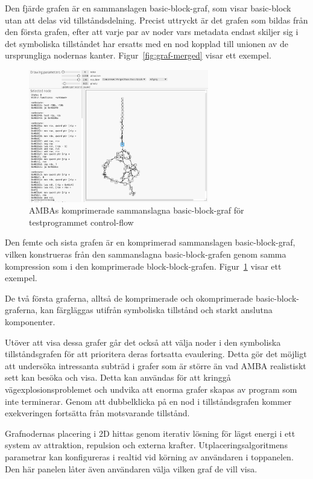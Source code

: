 Den fjärde grafen är en sammanslagen basic-block-graf, som visar basic-block
utan att delas vid tillståndsdelning. Precist uttryckt är det grafen som bildas
från den första grafen, efter att varje par av noder vars metadata endast
skiljer sig i det symboliska tillståndet har ersatts med en nod kopplad till unionen av
de ursprungliga nodernas kanter. Figur~\ref{fig:graf-merged} visar ett exempel.

\begin{figure}
    \centering
    \includegraphics[width=0.7\textwidth]{figures/graph_merged_compressed.png}
    \caption{
        AMBAs komprimerade sammanslagna basic-block-graf för testprogrammet control-flow
    }\label{fig:graf-merged-compressed}
\end{figure}

Den femte och sista grafen är en komprimerad sammanslagen basic-block-graf,
vilken konstrueras från den sammanslagna basic-block-grafen genom samma
kompression som i den komprimerade block-block-grafen.
Figur~\ref{fig:graf-merged-compressed} visar ett exempel.

De två första graferna, alltså de komprimerade och okomprimerade
basic-block-graferna, kan färgläggas utifrån symboliska tillstånd och starkt
anslutna komponenter.

Utöver att visa dessa grafer går det också att välja noder i den symboliska
tillståndsgrafen för att prioritera deras fortsatta evaulering. Detta gör det
möjligt att undersöka intressanta subträd i grafer som är större än vad AMBA
realistiskt sett kan besöka och visa. Detta kan användas för att kringgå
vägexplosionsproblemet och undvika att enorma grafer skapas av program som inte
terminerar. Genom att dubbelklicka på en nod i tillståndsgrafen kommer
exekveringen fortsätta från motsvarande tillstånd.

Grafnodernas placering i 2D hittas genom iterativ lösning för lägst energi i ett
system av attraktion, repulsion och externa krafter. Utplaceringsalgoritmens
parametrar kan konfigureras i realtid vid körning av användaren i toppanelen.
Den här panelen låter även användaren välja vilken graf de vill visa.

